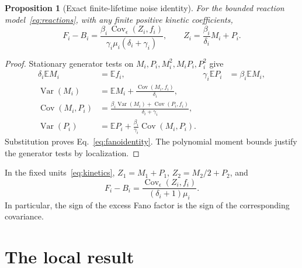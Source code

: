 \documentclass[11pt]{article}
\newcommand{\E}{\mathbb E}
\newcommand{\Var}{\operatorname{Var}}
\newcommand{\Cov}{\operatorname{Cov}}
\newtheorem{proposition}{Proposition}
\begin{document}
\begin{proposition}[Exact finite-lifetime noise identity]
\label{prop:identity}
For the bounded reaction model~\eqref{eq:reactions}, with any finite
positive kinetic coefficients,
\begin{equation}
 F_i-B_i=
 \frac{\beta_i\,\Cov_\epsilon(Z_i,f_i)}
 {\gamma_i\mu_i(\delta_i+\gamma_i)},\qquad
 Z_i=\frac{\beta_i}{\delta_i}M_i+P_i.
 \label{eq:fanoidentity}
\end{equation}
\end{proposition}
\begin{proof}
Stationary generator tests on $M_i,P_i,M_i^2,M_iP_i,P_i^2$ give
\begin{align}
 \delta_i\E M_i&=\E f_i,&
 \gamma_i\E P_i&=\beta_i\E M_i,\nonumber\\
 \Var(M_i)&=\E M_i+\frac{\Cov(M_i,f_i)}{\delta_i},\nonumber\\
 \Cov(M_i,P_i)&=
 \frac{\beta_i\Var(M_i)+\Cov(P_i,f_i)}{\delta_i+\gamma_i},\nonumber\\
 \Var(P_i)&=\E P_i+\frac{\beta_i}{\gamma_i}\Cov(M_i,P_i).
 \label{eq:momentidentity}
\end{align}
Substitution proves Eq.~\eqref{eq:fanoidentity}. The polynomial moment
bounds justify the generator tests by localization.
\end{proof}
In the fixed units~\eqref{eq:kinetics}, $Z_1=M_1+P_1$,
$Z_2=M_2/2+P_2$, and
\begin{equation}
 F_i-B_i=\frac{\Cov_\epsilon(Z_i,f_i)}{(\delta_i+1)\mu_i}.
 \label{eq:fixedidentity}
\end{equation}
In particular, the sign of the excess Fano factor is the sign of the
corresponding covariance.

\section{The local result}
\label{sec:result}
\end{document}
